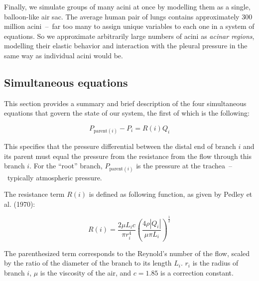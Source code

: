 
Finally, we simulate groups of many acini at once by modelling them as a single, balloon-like air
sac. The average human pair of lungs contains approximately 300 million acini~--~far too many to
assign unique variables to each one in a system of equations. So we approximate arbitrarily large
numbers of acini as \textit{acinar regions}, modelling their elastic behavior and interaction with
the pleural pressure in the same way as individual acini would be.

\subsection{Simultaneous equations}

This section provides a summary and brief description of the four simultaneous equations that govern
the state of our system, the first of which is the following:

\begin{equation}
    P_{\text{parent}(i)} - P_i = R(i) Q_i
\end{equation}

\noindent
This specifies that the pressure differential between the distal end of branch $i$ and its parent
must equal the pressure from the resistance from the flow through this branch $i$. For the ``root''
branch, $P_{\text{parent}(i)}$ is the pressure at the trachea~--~typically atmospheric pressure.

The resistance term $R(i)$ is defined as following function, as given by Pedley et al. (1970):

\begin{equation*}
    R(i) = \frac{2 \mu L_i c}{\pi r_i^4} \left( \frac{4 \rho |Q_i|}{\mu \pi L_i} \right)^{\frac{1}{2}}
\end{equation*}

The parenthesized term corresponds to the Reynold's number of the flow, scaled by the ratio of the
diameter of the branch to its length $L_i$. $r_i$ is the radius of branch $i$, $\mu$ is the
viscosity of the air, and $c = 1.85$ is a correction constant.

